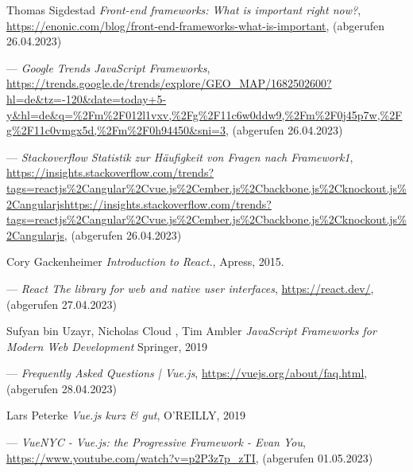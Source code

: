 %

\begin{thebibliography}{99}

    Thomas Sigdestad
	\emph{Front-end frameworks: What is important right now?},
	\url{https://enonic.com/blog/front-end-frameworks-what-is-important},
    (abgerufen 26.04.2023)

	---
	\emph{Google Trends JavaScript Frameworks},
	\url{https://trends.google.de/trends/explore/GEO_MAP/1682502600?hl=de&tz=-120&date=today+5-y&hl=de&q=%2Fm%2F012l1vxv,%2Fg%2F11c6w0ddw9,%2Fm%2F0j45p7w,%2Fg%2F11c0vmgx5d,%2Fm%2F0h94450&sni=3},
	(abgerufen 26.04.2023)

	---
	\emph{Stackoverflow Statistik zur Häufigkeit von Fragen nach Framework1},
	\url{https://insights.stackoverflow.com/trends?tags=reactjs%2Cangular%2Cvue.js%2Cember.js%2Cbackbone.js%2Cknockout.js%2Cangularjshttps://insights.stackoverflow.com/trends?tags=reactjs%2Cangular%2Cvue.js%2Cember.js%2Cbackbone.js%2Cknockout.js%2Cangularjs},
	(abgerufen 26.04.2023)

	Cory Gackenheimer
	\emph{Introduction to React.},
	Apress,
	2015.

	---
	\emph{React
	The library for web and native user interfaces},
	\url{https://react.dev/},
	(abgerufen 27.04.2023)

	Sufyan bin Uzayr, Nicholas Cloud , Tim Ambler
	\emph{JavaScript Frameworks for Modern Web Development}
	Springer,
	2019

	---
	\emph{Frequently Asked Questions | Vue.js},
	\url{https://vuejs.org/about/faq.html},
	(abgerufen 28.04.2023)

	Lars Peterke
	\emph{Vue.js kurz \& gut},
	O’REILLY,
	2019

	---
	\emph{VueNYC - Vue.js: the Progressive Framework - Evan You},
	\url{https://www.youtube.com/watch?v=p2P3z7p_zTI},
	(abgerufen 01.05.2023)


\end{thebibliography}
